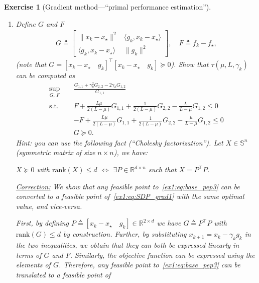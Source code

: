 \documentclass[11pt,a4paper]{article}
\newcommand{\correction}[1]{{{\color{blue}\underline{Correction:} #1}}}
\newcommand{\correction}[1]{}
\newtheorem{exercise}{Exercise}
\begin{document}
\begin{exercise}[Gradient method---``primal performance estimation'']
\begin{enumerate}
	\correction{From , there exists an $L$-smooth $\mu$-strongly convex function satisfying $g_k=\nabla f(x_k)$, $g_\star=\nabla f(x_\star)$, $f_k=f(x_k)$ and $f_\star=f(x_\star)$ if and only if those inequalities are satisfied. Hence any feasible point to~\eqref{ex1:eq:base_pep3} can be converted to a feasible point to~\eqref{ex1:eq:base_pep2} and vice-versa (\Cref{thm:interp_smoothstronglyconvex} provides necessary and sufficient conditions).}
	\item Define $G$ and $F$
			\begin{align*}
			G \triangleq \begin{bmatrix}
			\|x_k-x_\star\|^2 & \langle g_k,x_k-x_\star\rangle\\
			\langle g_k, x_k-x_\star\rangle & \| g_k\|^2
			\end{bmatrix},\quad 	F \triangleq 			f_k-f_\star,
			\end{align*}
			(note that $G=[x_k-x_\star \quad g_k]^\top [x_k-x_\star \quad g_k]\succcurlyeq 0$). Show that $\tau(\mu,L,\gamma_k)$ can be computed as
			\begin{equation}\label{ex1:eq:SDP_grad1}
			\begin{aligned}
			\sup_{G,\, F} \quad & \frac{G_{1,1}+\gamma_k ^2 G_{2,2}-2\gamma_k G_{1,2}}{G_{1,1}}\\
			\text{s.t. } \quad & F + \tfrac{L\mu}{2(L-\mu)} G_{1,1}+\tfrac{1}{2(L-\mu)}G_{2,2}-\tfrac{L}{L-\mu}G_{1,2}\leqslant 0\\
			&-F + \tfrac{L\mu}{2(L-\mu)} G_{1,1}+\tfrac{1}{2(L-\mu)}G_{2,2}-\tfrac{\mu}{L-\mu}G_{1,2}\leqslant 0\\
			&G\succcurlyeq 0.
			\end{aligned}
			\end{equation}
	Hint: you can use the following fact (``Cholesky factorization''). Let $X\in \mathbb{S}^n$ (symmetric matrix of size $n\times n$), we have:
	\begin{center}
	$X\succcurlyeq 0$ with $\mathrm{rank}(X)\leqslant d$ $\Leftrightarrow$ $\exists P\in\mathbb{R}^{d\times n}$ such that $X=P^\top\! P$.
	\end{center}
	
	
	\correction{We show that any feasible point to~\eqref{ex1:eq:base_pep3} can be converted to a feasible point of~\eqref{ex1:eq:SDP_grad1} with the same optimal value, and vice-versa.
	
	First, by defining $P\triangleq[x_k-x_\star \quad g_k]\in\mathbb{R}^{2\times d}$ we have $G\triangleq P^{\top\!}P$ with $\mathrm{rank}(G)\leq d$ by construction. Further, by substituting $x_{k+1}=x_k-\gamma_k g_k$ in the two inequalities, we obtain that they can both be expressed linearly in terms of $G$ and $F$. Similarly, the objective function can be expressed using the elements of $G$. Therefore, any feasible point to~\eqref{ex1:eq:base_pep3} can be translated to a feasible point of

}
\end{enumerate}
\end{exercise}
\end{document}
